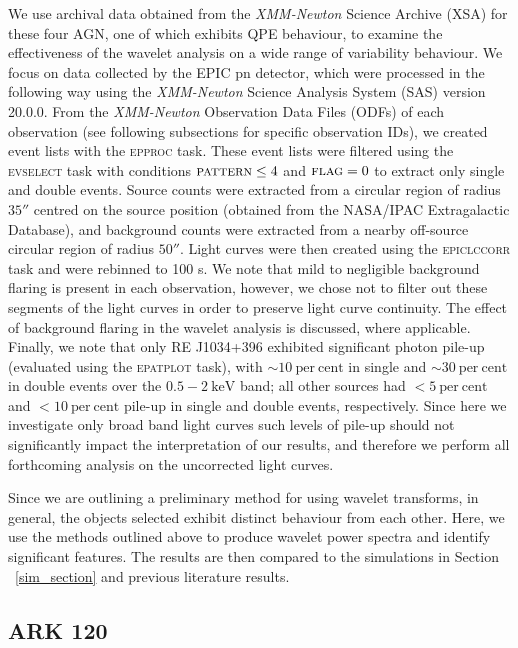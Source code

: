 \documentclass[fleqn,usenatbib]{mnras}
\begin{document}
We use archival data obtained from the \textit{XMM-Newton} \citep{Jansen+2001} Science Archive (XSA) for these four AGN, one of which exhibits QPE behaviour, to examine the effectiveness of the wavelet analysis on a wide range of variability behaviour. We focus on data collected by the EPIC pn \citep{Struder+2001} detector, which were processed in the following way using the \textit{XMM-Newton} Science Analysis System (SAS) version 20.0.0. From the \textit{XMM-Newton} Observation Data Files (ODFs) of each observation (see following subsections for specific observation IDs), we created event lists with the \textsc{epproc} task. These event lists were filtered using the \textsc{evselect} task with conditions $\textsc{pattern} \leq 4$ and $\textsc{flag} = 0$ to extract only single and double events. Source counts were extracted from a circular region of radius $35''$ centred on the source position (obtained from the NASA/IPAC Extragalactic Database), and background counts were extracted from a nearby off-source circular region of radius $50''$. Light curves were then created using the \textsc{epiclccorr} task and were rebinned to 100 s. We note that mild to negligible background flaring is present in each observation, however, we chose not to filter out these segments of the light curves in order to preserve light curve continuity. The effect of background flaring in the wavelet analysis is discussed, where applicable. Finally, we note that only RE J1034+396 exhibited significant photon pile-up (evaluated using the \textsc{epatplot} task), with $\sim10~\mathrm{per~cent}$ in single and $\sim30~\mathrm{per~cent}$ in double events over the $0.5-2~\mathrm{keV}$ band; all other sources had $<5~\mathrm{per~cent}$ and $<10~\mathrm{per~cent}$ pile-up in single and double events, respectively. Since here we investigate only broad band light curves such levels of pile-up should not significantly impact the interpretation of our results, and therefore we perform all forthcoming analysis on the uncorrected light curves.

Since we are outlining a preliminary method for using wavelet transforms, in general, the objects selected exhibit distinct behaviour from each other.  Here, we use the methods outlined above to produce wavelet power spectra and identify significant features.  The results are then compared to the simulations in Section ~\ref {sim_section} and previous literature results.


\subsection{ARK 120}
\end{document}
